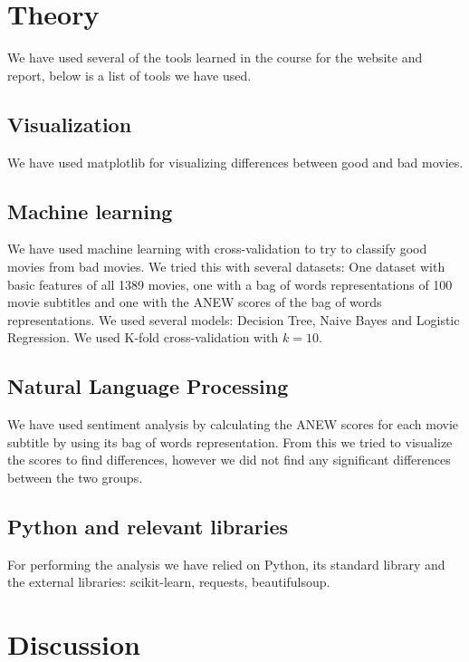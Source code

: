 \documentclass{acm_proc_article-sp}
\begin{document}
\section{Theory}
We have used several of the tools learned in the course for the website and report, below is a list of tools we have used.\\
\subsection{Visualization}
We have used matplotlib for visualizing differences between good and bad movies. 
\subsection{Machine learning}
We have used machine learning with cross-validation to try to classify good movies from bad movies. We tried this with several datasets: One dataset with basic features of all 1389 movies, one with a bag of words representations of 100 movie subtitles and one with the ANEW scores of the bag of words representations. We used several models: Decision Tree, Naive Bayes and Logistic Regression. We used K-fold cross-validation with $k=10$.

\subsection{Natural Language Processing}
We have used sentiment analysis by calculating the ANEW scores for each movie subtitle by using its bag of words representation. From this we tried to visualize the scores to find differences, however we did not find any significant differences between the two groups.\\
\subsection{Python and relevant libraries}
For performing the analysis we have relied on Python, its standard library and the external libraries: scikit-learn, requests, beautifulsoup.

\section{Discussion}
\end{document}
